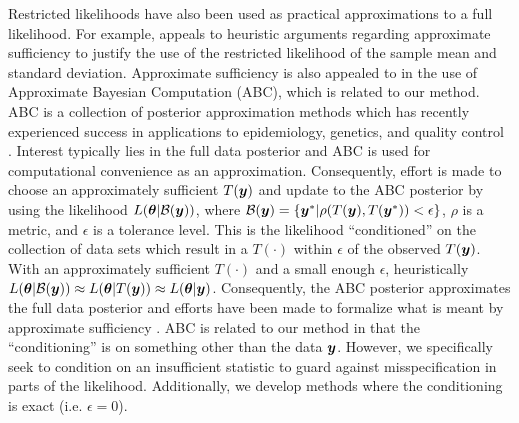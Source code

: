 \documentclass[12pt]{article}
\def\bth{\mbox{\boldmath $\theta$}}
\newcommand{\by}{\mbox{\boldmath $y$}}
\newcommand{\bz}{\mbox{\boldmath $z$}}
\begin{document}
Restricted likelihoods have also been used as practical approximations to a full likelihood. For example, \cite{pratt1965} appeals to heuristic arguments regarding approximate sufficiency to justify the use of the restricted likelihood of the sample mean and standard deviation. Approximate sufficiency is also appealed to in the use of Approximate Bayesian Computation (ABC), which is related to our method.  
ABC is a collection of posterior approximation methods which has recently experienced success in applications to epidemiology, genetics, and quality control \citep[see, for example,][]{tavare1997, pritchard1999,  marjoram2003, fearnhead2012}. Interest typically lies in the full data posterior and ABC is used for computational convenience as an approximation.  Consequently, effort is made to choose an approximately sufficient $T(\by)$ and update to the ABC posterior by using the likelihood $L(\bth| \mathcal{B}(\by))$, where $\mathcal{B}(\by)=\{\by^{*}|\rho(T(\by),T(\by^{*}))<\epsilon\}$, $\rho$ is a metric, and $\epsilon$ is a tolerance level. This is the likelihood ``conditioned'' on the collection of data sets which result in a $T(\cdot)$ within $\epsilon$ of the observed $T(\by)$. %
With an approximately sufficient $T(\cdot)$ and a small enough $\epsilon$, heuristically  $L(\bth|\mathcal{B}(\by))\approx L(\bth|T(\by))\approx L(\bth|\by)$. Consequently, the ABC posterior approximates the full data posterior and efforts have been made to formalize what is meant by  approximate sufficiency \citep[e.g.,][]{joyce2008}. ABC is related to our method in that the ``conditioning'' is on something other than the data $\by$.  However, we specifically seek to condition on an insufficient statistic to guard against misspecification in parts of the likelihood. Additionally, we develop methods where the conditioning is exact (i.e. $\epsilon = 0$).


\end{document}
